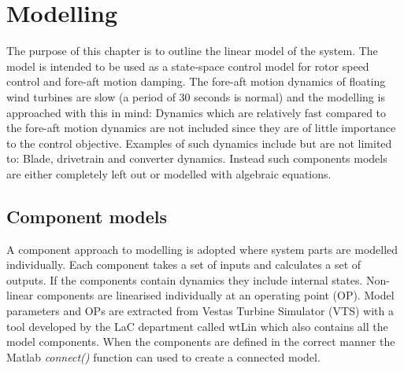 \section{Modelling} \label{sec:mod} %
The purpose of this chapter is to outline the linear model of the system. The model is intended to be used as a state-space control model for rotor speed control and fore-aft motion damping. The fore-aft motion dynamics of floating wind turbines are slow (a period of 30 seconds is normal) and the modelling is approached with this in mind: Dynamics which are relatively fast compared to the fore-aft motion dynamics are not included since they are of little importance to the control objective. Examples of such dynamics include but are not limited to: Blade, drivetrain and converter dynamics. Instead such components models are either completely left out or modelled with algebraic equations. 


%
%


\subsection{Component models} \label{sec:comp}
A component approach to modelling is adopted where system parts are modelled individually. Each component takes a set of inputs and calculates a set of outputs. If the components contain dynamics they include internal states. Non-linear components are linearised individually at an operating point (OP). Model parameters and OPs are extracted from Vestas Turbine Simulator (VTS) with a tool developed by the LaC department called wtLin which also contains all the model components. When the components are defined in the correct manner the Matlab \textit{connect()} function can used to create a connected model.

